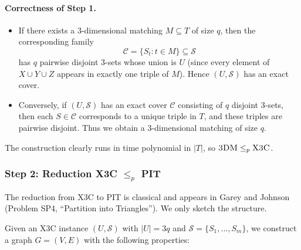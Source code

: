 \documentclass[9pt]{extarticle}
\begin{document}
\paragraph{Correctness of Step 1.}

\begin{itemize}
    \item If there exists a 3-dimensional matching $M \subseteq T$ of size $q$,
    then the corresponding family
    \[
        \mathcal{C} = \{ S_t : t \in M \} \subseteq \mathcal{S}
    \]
    has $q$ pairwise disjoint 3-sets whose union is $U$ (since every element of
    $X \cup Y \cup Z$ appears in exactly one triple of $M$).  Hence $(U,\mathcal{S})$
    has an exact cover.

    \item Conversely, if $(U,\mathcal{S})$ has an exact cover $\mathcal{C}$
    consisting of $q$ disjoint 3-sets, then each $S \in \mathcal{C}$ corresponds 
    to a unique triple in $T$, and these triples are pairwise disjoint.  Thus we
    obtain a 3-dimensional matching of size $q$.
\end{itemize}

The construction clearly runs in time polynomial in $|T|$, so
$\textsc{3DM} \le_p \textsc{X3C}$.

\subsubsection*{Step 2: Reduction \textsc{X3C} {$\le_p$} \textsc{PIT}}

The reduction from X3C to PIT is classical and appears in Garey and Johnson
(Problem SP4, ``Partition into Triangles'').  We only sketch the structure.

Given an X3C instance $(U,\mathcal{S})$ with $|U| = 3q$ and
$\mathcal{S} = \{S_1,\dots,S_m\}$, we construct a graph $G = (V,E)$ with the
following properties:
\end{document}
